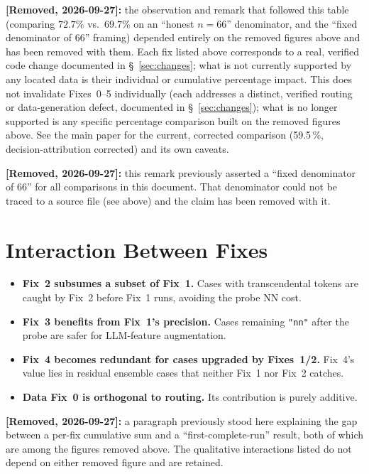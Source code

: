 \documentclass[twoside,11pt]{article}
\begin{document}
\textbf{[Removed, 2026-09-27]:} the observation and remark that followed
this table (comparing $72.7\%$ vs.\ $69.7\%$ on an ``honest $n{=}66$''
denominator, and the ``fixed denominator of 66'' framing) depended entirely
on the removed figures above and has been removed with them. Each fix
listed above corresponds to a real, verified code change documented in
\S~\ref{sec:changes}; what is not currently supported by any located data
is their individual or cumulative percentage impact.
This does not invalidate Fixes~0--5 individually (each addresses a
distinct, verified routing or data-generation defect, documented in
\S~\ref{sec:changes}); what is no longer supported is any specific
percentage comparison built on the removed figures above. See the main
paper for the current, corrected comparison (59.5\,\%, decision-attribution
corrected) and its own caveats.

\begin{remark}
\textbf{[Removed, 2026-09-27]:} this remark previously asserted a
``fixed denominator of 66'' for all comparisons in this document. That
denominator could not be traced to a source file (see above) and the
claim has been removed with it.
\end{remark}

\section{Interaction Between Fixes}
\label{sec:interactions}

\begin{itemize}[leftmargin=*]
  \item \textbf{Fix~2 subsumes a subset of Fix~1.}  Cases with transcendental
    tokens are caught by Fix~2 before Fix~1 runs, avoiding the probe NN cost.
  \item \textbf{Fix~3 benefits from Fix~1's precision.}  Cases remaining
    \texttt{"nn"} after the probe are safer for LLM-feature augmentation.
  \item \textbf{Fix~4 becomes redundant for cases upgraded by Fixes~1/2.}
    Fix~4's value lies in residual ensemble cases that neither Fix~1 nor
    Fix~2 catches.
  \item \textbf{Data Fix~0 is orthogonal to routing.}  Its contribution
    is purely additive.
\end{itemize}

\textbf{[Removed, 2026-09-27]:} a paragraph previously stood here explaining
the gap between a per-fix cumulative sum and a ``first-complete-run''
result, both of which are among the figures removed above. The qualitative
interactions listed do not depend on either removed figure and are
retained.
\end{document}
